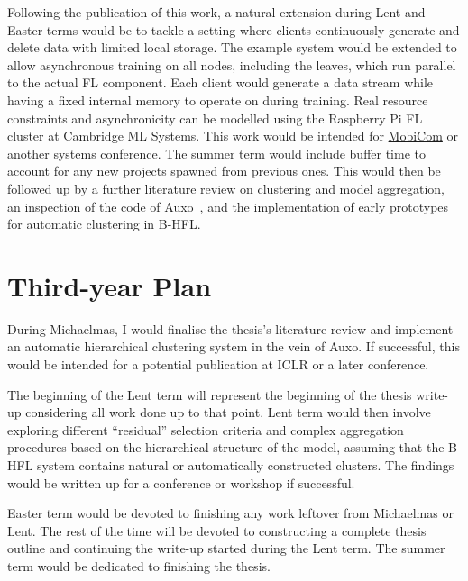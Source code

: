 Following the publication of this work, a natural extension during Lent and Easter terms would be to tackle a setting where clients continuously generate and delete data with limited local storage. The example system would be extended to allow asynchronous training on all nodes, including the leaves, which run parallel to the actual FL component. Each client would generate a data stream while having a fixed internal memory to operate on during training. Real resource constraints and asynchronicity can be modelled using the Raspberry Pi FL cluster at Cambridge ML Systems. This work would be intended for \href{https://sigmobile.org/mobicom/2023/}{MobiCom} or another systems conference. The summer term would include buffer time to account for any new projects spawned from previous ones. This would then be followed up by a further literature review on clustering and model aggregation, an inspection of the code of Auxo~\citep{Auxo}, and the implementation of early prototypes for automatic clustering in B-HFL\@.
\section{Third-year Plan}
During Michaelmas, I would finalise the thesis's literature review and implement an automatic hierarchical clustering system in the vein of Auxo. If successful, this would be intended for a potential publication at ICLR or a later conference.

The beginning of the Lent term will represent the beginning of the thesis write-up considering all work done up to that point. Lent term would then involve exploring different ``residual'' selection criteria and complex aggregation procedures based on the hierarchical structure of the model, assuming that the B-HFL system contains natural or automatically constructed clusters. The findings would be written up for a conference or workshop if successful.

Easter term would be devoted to finishing any work leftover from Michaelmas or Lent. The rest of the time will be devoted to constructing a complete thesis outline and continuing the write-up started during the Lent term. The summer term would be dedicated to finishing the thesis.


